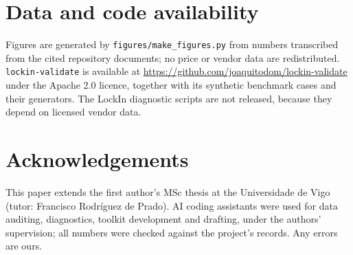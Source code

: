 \documentclass[11pt]{article}
\begin{document}
\section*{Data and code availability}
Figures are generated by \texttt{figures/make\_figures.py} from numbers transcribed from the cited repository documents; no price or vendor data are redistributed. \texttt{lockin-validate} is available at \url{https://github.com/joaquitodom/lockin-validate} under the Apache 2.0 licence, together with its synthetic benchmark cases and their generators. The LockIn diagnostic scripts are not released, because they depend on licensed vendor data.

\section*{Acknowledgements}
This paper extends the first author's MSc thesis at the Universidade de Vigo (tutor: Francisco Rodr\'iguez de Prado). AI coding assistants were used for data auditing, diagnostics, toolkit development and drafting, under the authors' supervision; all numbers were checked against the project's records. Any errors are ours.




\appendix
\end{document}
